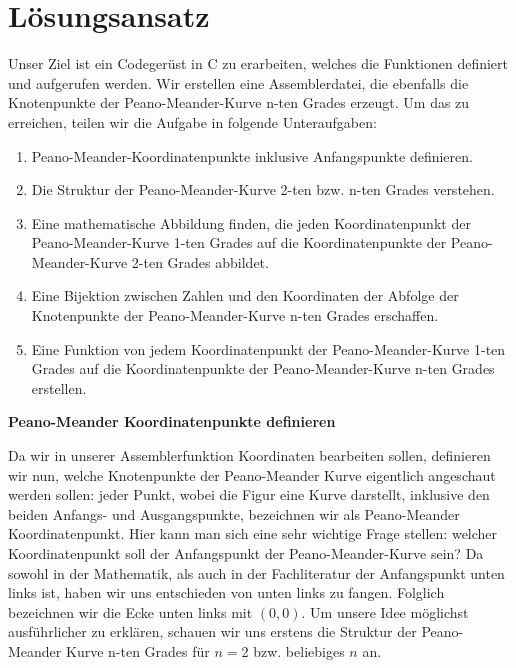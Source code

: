 \documentclass[course=erap]{aspdoc}
\begin{document}
\section{Lösungsansatz}
\hspace{0.3cm}
Unser Ziel ist ein Codegerüst in C zu erarbeiten, welches die Funktionen definiert und aufgerufen werden. Wir erstellen eine Assemblerdatei, die ebenfalls die Knotenpunkte der Peano-Meander-Kurve n-ten Grades erzeugt. Um das zu erreichen, teilen wir die Aufgabe in folgende Unteraufgaben:
\begin{enumerate}
  \item Peano-Meander-Koordinatenpunkte inklusive Anfangspunkte definieren.
  \item Die Struktur der Peano-Meander-Kurve 2-ten bzw. n-ten Grades verstehen.
  \item Eine mathematische Abbildung finden, die jeden Koordinatenpunkt der Peano-Meander-Kurve 1-ten Grades auf die Koordinatenpunkte der Peano-Meander-Kurve 2-ten Grades abbildet.
  \item Eine Bijektion zwischen Zahlen und den Koordinaten der Abfolge der Knotenpunkte der Peano-Meander-Kurve n-ten Grades erschaffen.
  \item Eine Funktion von jedem Koordinatenpunkt der Peano-Meander-Kurve 1-ten Grades auf die Koordinatenpunkte der Peano-Meander-Kurve n-ten Grades erstellen.\newline
\end{enumerate}

\large\textbf{Peano-Meander Koordinatenpunkte definieren}\newline

Da wir in unserer Assemblerfunktion Koordinaten bearbeiten sollen, definieren wir nun, welche Knotenpunkte der Peano-Meander Kurve eigentlich angeschaut werden sollen: jeder Punkt, wobei die Figur eine Kurve darstellt, inklusive den beiden Anfangs- und Ausgangspunkte, bezeichnen wir als Peano-Meander Koordinatenpunkt. Hier kann man sich eine sehr wichtige Frage stellen: welcher Koordinatenpunkt soll der Anfangspunkt der Peano-Meander-Kurve sein?
Da sowohl in der Mathematik, als auch in der Fachliteratur der Anfangspunkt unten links ist\cite{BaderBook}, haben wir uns entschieden von unten links zu fangen. Folglich bezeichnen wir die Ecke unten links mit $(0,0)$. Um unsere Idee möglichst ausführlicher zu erklären, schauen wir uns erstens die Struktur der Peano-Meander Kurve n-ten Grades für $n=2$ bzw. beliebiges $n$ an.\newline
\end{document}
